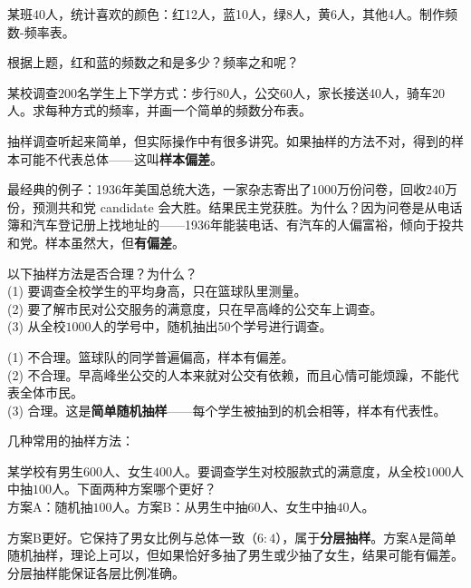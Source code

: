 \begin{exercise}
\item 某班$40$人，统计喜欢的颜色：红12人，蓝10人，绿8人，黄6人，其他4人。制作频数-频率表。
\item 根据上题，红和蓝的频数之和是多少？频率之和呢？
\item 某校调查$200$名学生上下学方式：步行80人，公交60人，家长接送40人，骑车20人。求每种方式的频率，并画一个简单的频数分布表。
\end{exercise}


抽样调查听起来简单，但实际操作中有很多讲究。如果抽样的方法不对，得到的样本可能不代表总体——这叫\textbf{样本偏差}。

最经典的例子：1936年美国总统大选，一家杂志寄出了$1000$万份问卷，回收$240$万份，预测共和党 candidate 会大胜。结果民主党获胜。为什么？因为问卷是从电话簿和汽车登记册上找地址的——1936年能装电话、有汽车的人偏富裕，倾向于投共和党。样本虽然大，但\textbf{有偏差}。

\begin{example}
以下抽样方法是否合理？为什么？\\
(1) 要调查全校学生的平均身高，只在篮球队里测量。\\
(2) 要了解市民对公交服务的满意度，只在早高峰的公交车上调查。\\
(3) 从全校$1000$人的学号中，随机抽出$50$个学号进行调查。
\end{example}
\begin{solution}
(1) 不合理。篮球队的同学普遍偏高，样本有偏差。\\
(2) 不合理。早高峰坐公交的人本来就对公交有依赖，而且心情可能烦躁，不能代表全体市民。\\
(3) 合理。这是\textbf{简单随机抽样}——每个学生被抽到的机会相等，样本有代表性。
\end{solution}

几种常用的抽样方法：


\begin{example}
某学校有男生$600$人、女生$400$人。要调查学生对校服款式的满意度，从全校$1000$人中抽$100$人。下面两种方案哪个更好？\\
方案A：随机抽$100$人。方案B：从男生中抽$60$人、女生中抽$40$人。
\end{example}
\begin{solution}
方案B更好。它保持了男女比例与总体一致（$6:4$），属于\textbf{分层抽样}。方案A是简单随机抽样，理论上可以，但如果恰好多抽了男生或少抽了女生，结果可能有偏差。分层抽样能保证各层比例准确。
\end{solution}

